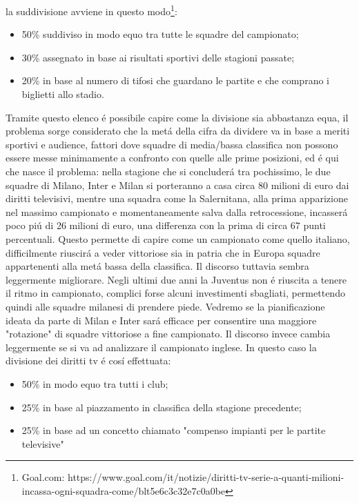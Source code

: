 \documentclass[
    corpo=12pt,
    oneside,
    evenboxes,
    tipotesi=triennale,
    stile=classica,
    oldstyle,
    autoretitolo,
    greek,
]{toptesi}
\begin{document}
\begin{interlinea}{1.5}
la suddivisione avviene in questo modo\footnote{Goal.com: https://www.goal.com/it/notizie/diritti-tv-serie-a-quanti-milioni-incassa-ogni-squadra-come/blt5e6c3c32e7c0a0be}:
\begin{itemize}
    \item 50\% suddiviso in modo equo tra tutte le squadre del campionato;
    \item 30\% assegnato in base ai risultati sportivi delle stagioni passate;
    \item 20\% in base al numero di tifosi che guardano le partite e che comprano i biglietti allo stadio.
\end{itemize}
Tramite questo elenco \'e possibile capire come la divisione sia abbastanza equa, il problema sorge considerato che la met\'a della cifra da dividere
va in base a meriti sportivi e audience, fattori dove squadre di media/bassa classifica non possono essere messe minimamente a confronto con
quelle alle prime posizioni, ed \'e qui che nasce il problema: nella stagione che si concluder\'a tra pochissimo, le due squadre di Milano, Inter
e Milan si porteranno a casa circa 80 milioni di euro dai diritti televisivi, mentre una squadra come la Salernitana, alla prima apparizione 
nel massimo campionato e momentaneamente salva dalla retrocessione, incasser\'a poco pi\'u di 26 milioni di euro, una differenza con la prima
di circa 67 punti percentuali. Questo permette di capire come un campionato come quello italiano, difficilmente riuscir\'a a veder vittoriose
sia in patria che in Europa squadre appartenenti alla met\'a bassa della classifica. Il discorso tuttavia sembra leggermente migliorare.
Negli ultimi due anni la Juventus non \'e riuscita a tenere il ritmo in campionato, complici forse alcuni investimenti sbagliati, permettendo 
quindi alle squadre milanesi di prendere piede. Vedremo se la pianificazione ideata da parte di Milan e Inter sar\'a efficace per consentire
una maggiore "rotazione" di squadre vittoriose a fine campionato.\newline
Il discorso invece cambia leggermente se si va ad analizzare il campionato inglese. In questo caso la divisione dei diritti tv \'e cos\'i effettuata:
\begin{itemize}
    \item 50\% in modo equo tra tutti i club;
    \item 25\% in base al piazzamento in classifica della stagione precedente;
    \item 25\% in base ad un concetto chiamato "compenso impianti per le partite televisive"

\end{itemize}
\end{interlinea}
\end{document}
